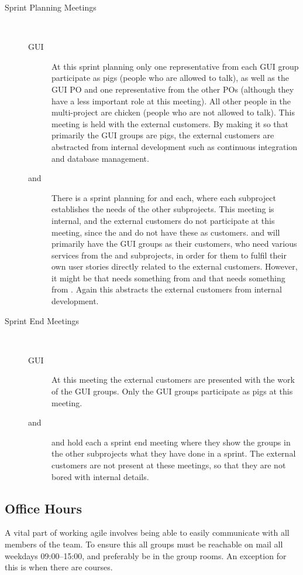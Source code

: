\begin{description}
\item[Sprint Planning Meetings]\hfill\\
\begin{description}
  \item[GUI] At this sprint planning only one representative from each GUI group participate as pigs (people who are allowed to talk), as well as the GUI PO and one representative from the other POs (although they have a less important role at this meeting). All other people in the multi-project are chicken (people who are not allowed to talk). This meeting is held with the external customers. By making it so that primarily the GUI groups are pigs, the external customers are abstracted from internal development such as continuous integration and database management.
  \item[\db and \bd] There is a sprint planning for \db and \bd each, where each subproject establishes the needs of the other subprojects. This meeting is internal, and the external customers do not participate at this meeting, since the \db and \bd do not have these as customers. \db and \bd will primarily have the GUI groups as their customers, who need various services from the \db and \bd subprojects, in order for them to fulfil their own user stories directly related to the external customers. However, it might be that \db needs something from \bd and that \bd needs something from \db. Again this abstracts the external customers from internal development.
\end{description}
\item[Sprint End Meetings]\hfill\\
\begin{description}
  \item[GUI] At this meeting the external customers are presented with the work of the GUI groups. Only the GUI groups participate as pigs at this meeting.
  \item[\db and \bd] \db and \bd hold each a sprint end meeting where they show the groups in the other subprojects what they have done in a sprint. The external customers are not present at these meetings, so that they are not bored with internal details.
\end{description}
\end{description}

\subsection{Office Hours}
A vital part of working agile involves being able to easily communicate with all members of the team. To ensure this all groups must be reachable on mail all weekdays 09:00--15:00, and preferably be in the group rooms. An exception for this is when there are courses.

